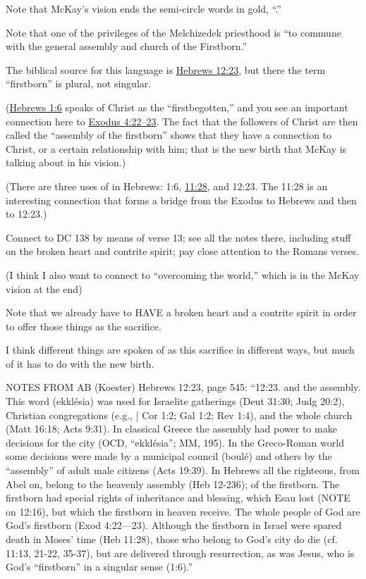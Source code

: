 \begin{compactitem}
\begin{compactitem}
					\item Note that McKay's vision ends the semi-circle words in gold, ``.''
					\item Note that one of the privileges of the Melchizedek priesthood is ``to commune with the general assembly and church of the Firstborn.''
					\item The biblical source for this language is \hyperref[HEBREWS-12-23]{Hebrews 12:23}, but there the term ``firstborn'' is plural, not singular.
					\item (\hyperref[HEBREWS-1-6]{Hebrews 1:6} speaks of Christ as the ``firstbegotten,'' and you see an important connection here to \hyperref[EXODUS-4-22]{Exodus 4:22--23}. The fact that the followers of Christ are then called the ``assembly of the firstborn'' shows that they have a connection to Christ, or a certain relationship with him; that is the new birth that McKay is talking about in his vision.)
					\item (There are three uses of  in Hebrews: 1:6, \hyperref[HEBREWS-11-28]{11:28}, and 12:23. The 11:28 is an interesting connection that forms a bridge from the Exodus to Hebrews and then to 12:23.)
					\item Connect to DC 138 by means of verse 13; see all the notes there, including stuff on the broken heart and contrite spirit; pay close attention to the Romans verses.
					\item (I think I also want to connect to ``overcoming the world,'' which is in the McKay vision at the end)
					\item Note that we already have to HAVE a broken heart and a contrite spirit in order to offer those things as the sacrifice.
					\item I think different things are spoken of as this sacrifice in different ways, but much of it has to do with the new birth.
					\item NOTES FROM AB (Koester) Hebrews 12:23, page 545: ``12:23. and the assembly. This word (ekklésia) was used for Israelite gatherings (Deut 31:30; Judg 20:2), Christian congregations (e.g., | Cor 1:2; Gal 1:2; Rev 1:4), and the whole church (Matt 16:18; Acts 9:31). In classical Greece the assembly had power to make decisions for the city (OCD, “ekklésia”; MM, 195). In the Greco-Roman world some decisions were made by a municipal council (boulé) and others by the “assembly” of adult male citizens (Acts 19:39). In Hebrews all the righteous, from Abel on, belong to the heavenly assembly (Heb 12-236); of the firstborn. The firstborn had special rights of inheritance and blessing, which Esau lost (NOTE on 12:16), but which the firstborn in heaven receive. The whole people of God are God’s firstborn (Exod 4:22—23). Although the firstborn in Israel were spared death in Moses’ time (Heb 11:28), those who belong to God’s city do die (cf. 11:13, 21-22, 35-37), but are delivered through resurrection, as was Jesus, who is God’s “firstborn” in a singular sense (1:6).''

\end{compactitem}
\end{compactitem}
